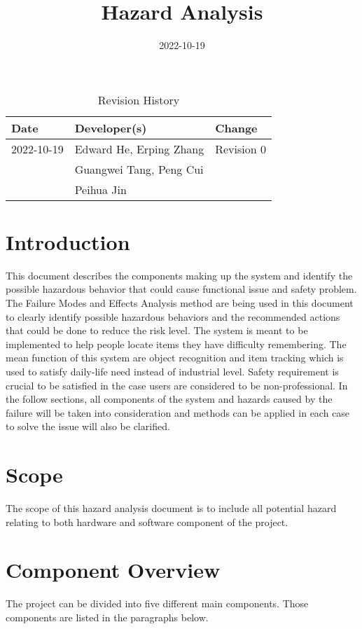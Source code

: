 \documentclass{article}
\title{Hazard Analysis\\\progname}
\author{\authname}
\date{2022-10-19}
\begin{document}
\maketitle

\newpage

\begin{table}[hp]
\caption{Revision History} \label{TblRevisionHistory}
\begin{tabularx}{\textwidth}{llX}
\toprule
\textbf{Date} & \textbf{Developer(s)} & \textbf{Change}\\
\midrule
2022-10-19 & Edward He, Erping Zhang & Revision 0\\
& Guangwei Tang, Peng Cui & \\
& Peihua Jin & \\
\bottomrule
\end{tabularx}
\end{table}

\newpage


\tableofcontents
\listoftables

\newpage
\section{Introduction}
This document describes the components making up the system and identify the possible hazardous behavior that could cause functional issue and safety problem. The Failure Modes and Effects Analysis method are being used in this document to clearly identify possible hazardous behaviors and the recommended actions that could be done to reduce the risk level. The system is meant to be implemented to help people locate items they have difficulty remembering. The mean function of this system are object recognition and item tracking which is used to satisfy daily-life need instead of industrial level. Safety requirement is crucial to be satisfied in the case users are considered to be non-professional. In the follow sections, all components of the system and hazards caused by the failure will be taken into consideration and methods can be applied in each case to solve the issue will also be clarified.
\section{Scope}
The scope of this hazard analysis document is to include all potential hazard relating to both hardware and software component of the project. 
\section{Component Overview}
The project can be divided into five different main components. Those components are listed in the paragraphs below.
\end{document}

